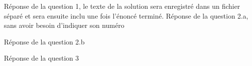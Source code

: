 \xsol
     Réponse de la question 1, le texte de la solution sera enregistré dans un fichier séparé et sera ensuite inclu une fois l'énoncé terminé.
\xsol
          Réponse de la question 2.a, sans avoir besoin d'indiquer son numéro
     
\xsol
          Réponse de la question  2.b
     
\xsol
     Réponse de la question 3
